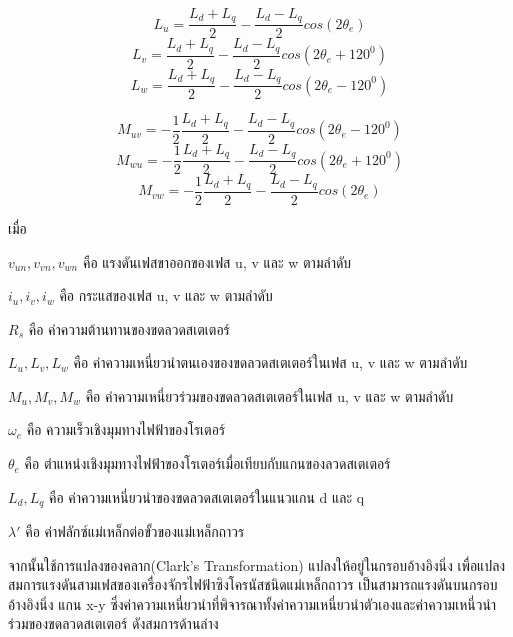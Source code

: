 \documentclass[11pt,a4paper]{article}
\begin{document}
\begin{equation}
    L_{u}  =  \frac{L_{d}+ L_{q}}{2} - \frac{L_{d} - L_{q}}{2}cos(2\theta_{e})
\end{equation}
\begin{equation}
    L_{v}  =  \frac{L_{d}+ L_{q}}{2} - \frac{L_{d} - L_{q}}{2}cos(2\theta_{e} + 120^0)
\end{equation}
\begin{equation}
    L_{w}  =  \frac{L_{d}+ L_{q}}{2} - \frac{L_{d} - L_{q}}{2}cos(2\theta_{e} - 120^0)
\end{equation}

\begin{equation}
    M_{uv}  =  -\frac{1}{2} \frac{L_{d}+ L_{q}}{2} - \frac{L_{d} - L_{q}}{2}cos(2\theta_{e} - 120^0)
\end{equation}
\begin{equation}
    M_{wu}  =  -\frac{1}{2} \frac{L_{d}+ L_{q}}{2} - \frac{L_{d} - L_{q}}{2}cos(2\theta_{e} + 120^0)
\end{equation}
\begin{equation}
    M_{vw}  =  -\frac{1}{2} \frac{L_{d}+ L_{q}}{2} - \frac{L_{d} - L_{q}}{2}cos(2\theta_{e})
\end{equation}

เมื่อ

$v_{un},v_{vn},v_{wn}$ คือ แรงดันเฟสขาออกของเฟส u, v และ w ตามลำดับ

$i_{u},i_{v},i_{w}$      คือ กระแสของเฟส u, v และ w ตามลำดับ

$R_{s}$               คือ ค่าความต้านทานของขดลวดสเตเตอร์

$L_{u},L_{v},L_{w}$        คือ ค่าความเหนี่ยวนำตนเองของขดลวดสเตเตอร์ในเฟส u, v และ w ตามลำดับ

$M_{u},M_{v},M_{w}$       คือ ค่าความเหนี่ยวร่วมของขดลวดสเตเตอร์ในเฟส u, v และ w ตามลำดับ

$\omega_{e}$                    คือ ความเร็วเชิงมุมทางไฟฟ้าของโรเตอร์

$\theta_{e}$               คือ ตำแหน่งเชิงมุมทางไฟฟ้าของโรเตอร์เมื่อเทียบกับแกนของลวดสเตเตอร์

$L_{d},L_{q}$                      คือ ค่าความเหนี่ยวนำของขดลวดสเตเตอร์ในแนวแกน d และ q

$\lambda'$ คือ ค่าฟลักซ์แม่เหล็กต่อขั้วของแม่เหล็กถาวร

จากนั้นใช้การแปลงของคลาก(Clark’s Transformation) \cite{sswch3} \cite{vectorIEEE} แปลงให้อยู่ในกรอบอ้างอิงนิ่ง เพื่อแปลงสมการแรงดันสามเฟสของเครื่องจักรไฟฟ้าซิงโครนัสชนิดแม่เหล็กถาวร เป็นสามารถแรงดันบนกรอบอ้างอิงนิ่ง แกน x-y ซึ่งค่าความเหนี่ยวนำที่พิจารณาทั้งค่าความเหนี่ยวนำตัวเองและค่าความเหนี่วนำร่วมของขดลวดสเตเตอร์ ดังสมการด้านล่าง
\end{document}
